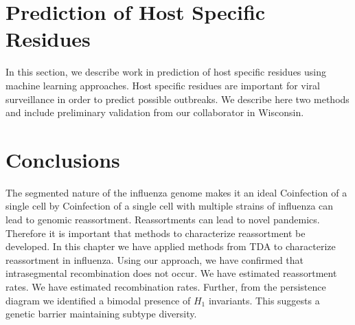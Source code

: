 \section{Prediction of Host Specific Residues}
\label{flu:flumarker}

In this section, we describe work in prediction of host specific residues using machine learning approaches.
Host specific residues are important for viral surveillance in order to predict possible outbreaks.
We describe here two methods and include preliminary validation from our collaborator in Wisconsin.

\section{Conclusions}
\label{flu:conclusions}

The segmented nature of the influenza genome makes it an ideal 
Coinfection of a single cell by 
Coinfection of a single cell with multiple strains of influenza can lead to genomic reassortment.
Reassortments can lead to novel pandemics.
Therefore it is important that methods to characterize reassortment be developed.
In this chapter we have applied methods from TDA to characterize reassortment in influenza.
Using our approach, we have confirmed that intrasegmental recombination does not occur.
We have estimated reassortment rates.
We have estimated recombination rates.
Further, from the persistence diagram we identified a bimodal presence of $H_1$ invariants.
This suggests a genetic barrier maintaining subtype diversity.





